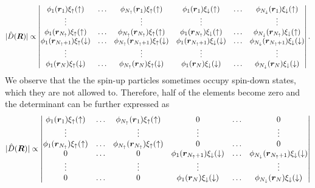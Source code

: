 \begin{equation*}
|\hat{D}(\boldsymbol{{R}})|\propto
\begin{vmatrix}
\phi_1(\boldsymbol{r}_1)\xi_{\uparrow}(\uparrow) & \hdots & \phi_{N_{\uparrow}}(\boldsymbol{r}_1)\xi_{\uparrow}(\uparrow) & \phi_{1}(\boldsymbol{r}_1)\xi_{\downarrow}(\uparrow) & \hdots & \phi_{N_{\downarrow}}(\boldsymbol{r}_1)\xi_{\downarrow}(\uparrow)\\
\vdots & & \vdots & \vdots & & \vdots \\
\phi_1(\boldsymbol{r}_{N_{\uparrow}})\xi_{\uparrow}(\uparrow) & \hdots & \phi_{N_{\uparrow}}(\boldsymbol{r}_{N_{\uparrow}})\xi_{\uparrow}(\uparrow) & \phi_{1}(\boldsymbol{r}_{N_{\uparrow}})\xi_{\downarrow}(\uparrow) & \hdots & \phi_{N_{\downarrow}}(\boldsymbol{r}_{N_{\uparrow}})\xi_{\downarrow}(\uparrow)\\
\phi_1(\boldsymbol{r}_{N_{\uparrow}+1})\xi_{\uparrow}(\downarrow) & \hdots & \phi_{N_{\uparrow}}(\boldsymbol{r}_{N_{\uparrow}+1})\xi_{\uparrow}(\downarrow) & \phi_{1}(\boldsymbol{r}_{N_{\uparrow}+1})\xi_{\downarrow}(\downarrow) & \hdots & \phi_{N_{\downarrow}}(\boldsymbol{r}_{N_{\uparrow}+1})\xi_{\downarrow}(\downarrow)\\
\vdots & & \vdots & \vdots & & \vdots \\
\phi_1(\boldsymbol{r}_N)\xi_{\uparrow}(\downarrow) & \hdots & \phi_{N_{\uparrow}}(\boldsymbol{r}_N)\xi_{\uparrow}(\downarrow) & \phi_{1}(\boldsymbol{r}_N)\xi_{\downarrow}(\downarrow) & \hdots & \phi_{N_{\downarrow}}(\boldsymbol{r}_N)\xi_{\downarrow}(\downarrow)\\
\end{vmatrix}.
\end{equation*}
We observe that the the spin-up particles sometimes occupy spin-down states, which they are not allowed to. Therefore, half of the elements become zero and the determinant can be further expressed as
\begin{equation*}
|\hat{D}(\boldsymbol{{R}})|\propto
\begin{vmatrix}
\phi_1(\boldsymbol{r}_1)\xi_{\uparrow}(\uparrow) & \hdots & \phi_{N_{\uparrow}}(\boldsymbol{r}_1)\xi_{\uparrow}(\uparrow) & 0 & \hdots & 0\\
\vdots & & \vdots & \vdots & & \vdots \\
\phi_1(\boldsymbol{r}_{N_{\uparrow}})\xi_{\uparrow}(\uparrow) & \hdots & \phi_{N_{\uparrow}}(\boldsymbol{r}_{N_{\uparrow}})\xi_{\uparrow}(\uparrow) & 0 & \hdots & 0\\
0 & \hdots & 0 & \phi_{1}(\boldsymbol{r}_{N_{\uparrow}+1})\xi_{\downarrow}(\downarrow) & \hdots & \phi_{N_{\downarrow}}(\boldsymbol{r}_{N_{\uparrow}+1})\xi_{\downarrow}(\downarrow)\\
\vdots & & \vdots & \vdots & & \vdots \\
0 & \hdots & 0 & \phi_{1}(\boldsymbol{r}_N)\xi_{\downarrow}(\downarrow) & \hdots & \phi_{N_{\downarrow}}(\boldsymbol{r}_N)\xi_{\downarrow}(\downarrow)\\
\end{vmatrix}
\end{equation*}
